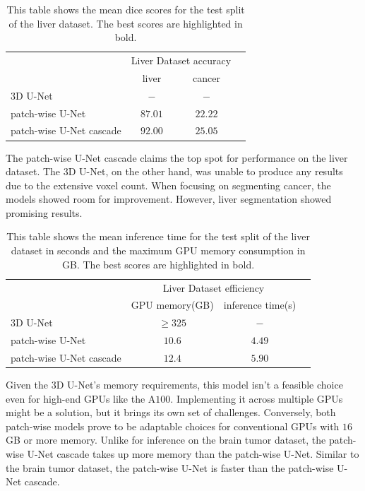 \newpage
\begin{table}[ht!]
\begin{center} {\footnotesize
\begin{tabular}{lccc}
\hline
	& \multicolumn{2}{c}{Liver Dataset accuracy} \\
	& \multicolumn{1}{c}{liver} & \multicolumn{1}{c}{cancer} \\
\hline
$3$D U-Net & $-$ & $-$ \\[1ex]
patch-wise U-Net & $87.01$ & $22.22$ \\[1ex]
patch-wise U-Net cascade & $\mathbf{92.00}$ & $\mathbf{25.05}$ \\[1ex]
\hline
\end{tabular} }
\end{center}
\caption{\footnotesize This table shows the mean dice scores for the test split of the liver dataset. The best scores are highlighted in bold.}
\label{tab:l-accuracy}
\end{table}

\noindent The patch-wise U-Net cascade claims the top spot for performance on the liver dataset. The $3$D U-Net, on the other hand, was unable to produce any results due to the extensive voxel count.
When focusing on segmenting cancer, the models showed room for improvement. However, liver segmentation showed promising results.

\begin{table}[ht!]
\begin{center} {\footnotesize
\begin{tabular}{lccc}
\hline
	& \multicolumn{2}{c}{Liver Dataset efficiency} \\
	& \multicolumn{1}{c}{GPU memory(GB)} & \multicolumn{1}{c}{inference time(s)} \\
\hline
$3$D U-Net & $\geq325$ & $-$ \\[1ex]
patch-wise U-Net & $\mathbf{10.6}$ & $\mathbf{4.49}$ \\[1ex]
patch-wise U-Net cascade & $12.4$ & $5.90$\\[1ex]
\hline
\end{tabular} }
\end{center}
\caption{\footnotesize This table shows the mean inference time for the test split of the liver dataset in seconds and the maximum GPU memory consumption in GB. The best scores are highlighted in bold.}
\label{tab:l-efficiency}
\end{table}

\noindent Given the $3$D U-Net's memory requirements,
this model isn't a feasible choice even for high-end GPUs like the A$100$. Implementing it across multiple GPUs might be a solution, but it brings its own set of challenges.
Conversely, both patch-wise models prove to be adaptable choices for conventional GPUs with $16$ GB or more memory. Unlike for inference on the brain tumor dataset,
the patch-wise U-Net cascade takes up more memory than the patch-wise U-Net. Similar to the brain tumor dataset, the patch-wise U-Net is faster than the patch-wise U-Net cascade.

